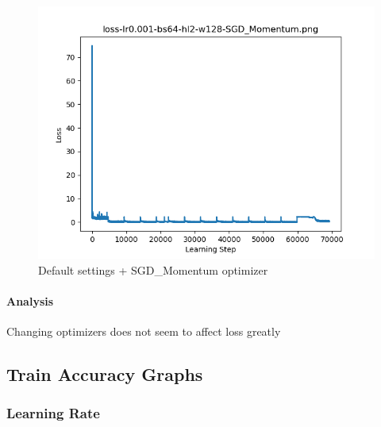\documentclass{article}[12pt]
\begin{document}
        \begin{figure}[H]
        \includegraphics[width=\linewidth]{testsResults/loss/optimizer/loss-lr0.001-bs64-hl2-w128-SGD_Momentum.png}
        \caption{Default settings + SGD\_Momentum optimizer}
        \endminipage
    \end{figure}

    \paragraph{Analysis} Changing optimizers does not seem to affect loss greatly


\subsection{Train Accuracy Graphs}

\subsubsection{Learning Rate}
\end{document}
